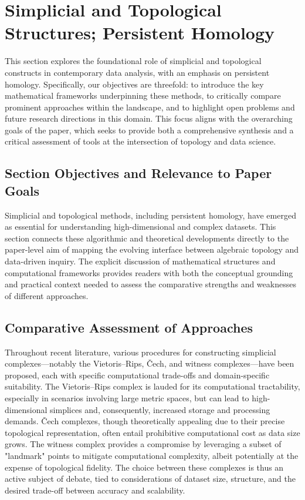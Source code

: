 \documentclass[sigconf]{acmart}
\begin{document}
\section{Simplicial and Topological Structures; Persistent Homology}

This section explores the foundational role of simplicial and topological constructs in contemporary data analysis, with an emphasis on persistent homology. Specifically, our objectives are threefold: to introduce the key mathematical frameworks underpinning these methods, to critically compare prominent approaches within the landscape, and to highlight open problems and future research directions in this domain. This focus aligns with the overarching goals of the paper, which seeks to provide both a comprehensive synthesis and a critical assessment of tools at the intersection of topology and data science.

\subsection{Section Objectives and Relevance to Paper Goals}

Simplicial and topological methods, including persistent homology, have emerged as essential for understanding high-dimensional and complex datasets. This section connects these algorithmic and theoretical developments directly to the paper-level aim of mapping the evolving interface between algebraic topology and data-driven inquiry. The explicit discussion of mathematical structures and computational frameworks provides readers with both the conceptual grounding and practical context needed to assess the comparative strengths and weaknesses of different approaches.

\subsection{Comparative Assessment of Approaches}

Throughout recent literature, various procedures for constructing simplicial complexes---notably the Vietoris–Rips, Čech, and witness complexes---have been proposed, each with specific computational trade-offs and domain-specific suitability. The Vietoris–Rips complex is lauded for its computational tractability, especially in scenarios involving large metric spaces, but can lead to high-dimensional simplices and, consequently, increased storage and processing demands. Čech complexes, though theoretically appealing due to their precise topological representation, often entail prohibitive computational cost as data size grows. The witness complex provides a compromise by leveraging a subset of "landmark" points to mitigate computational complexity, albeit potentially at the expense of topological fidelity. The choice between these complexes is thus an active subject of debate, tied to considerations of dataset size, structure, and the desired trade-off between accuracy and scalability.
\end{document}
